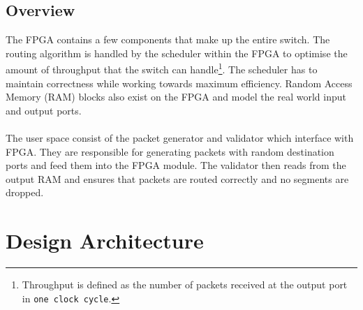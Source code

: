 \documentclass[twoside,12pt,fleqn]{book} %
\begin{document}
\section{Overview}
The FPGA contains a few components that make up the entire switch. The routing algorithm is handled by the scheduler within the FPGA to optimise the amount of throughput that the switch can handle\footnote{Throughput is defined as the number of packets received at the output port in \texttt{one clock cycle}.}. The scheduler has to maintain correctness while working towards maximum efficiency. Random Access Memory (RAM) blocks also exist on the FPGA and model the real world input and output ports.\\\\
The user space consist of the packet generator and validator which interface with FPGA. They are responsible for generating packets with random destination ports and feed them into the FPGA module. The validator then reads from the output RAM and ensures that packets are routed correctly and no segments are dropped.


\let\cleardoublepage\clearpage

\chapter{Design Architecture}
\end{document}
